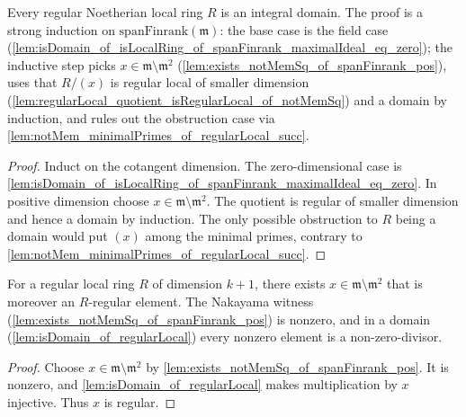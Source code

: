 \begin{lemma}\leanok
  \label{lem:isDomain_of_regularLocal}
  Every regular Noetherian local ring \(R\) is an integral domain. The proof is a strong
  induction on \(\text{spanFinrank}(\mathfrak m)\): the base case is the field case
  (\cref{lem:isDomain_of_isLocalRing_of_spanFinrank_maximalIdeal_eq_zero}); the inductive
  step picks \(x \in \mathfrak m \setminus \mathfrak m^2\)
  (\cref{lem:exists_notMemSq_of_spanFinrank_pos}), uses that \(R/(x)\) is regular local of
  smaller dimension (\cref{lem:regularLocal_quotient_isRegularLocal_of_notMemSq}) and a
  domain by induction, and rules out the obstruction case via
  \cref{lem:notMem_minimalPrimes_of_regularLocal_succ}.
\end{lemma}
\begin{proof}

\leanok
  Induct on the cotangent dimension. The zero-dimensional case is
  \cref{lem:isDomain_of_isLocalRing_of_spanFinrank_maximalIdeal_eq_zero}.
  In positive dimension choose \(x\in\mathfrak m\setminus\mathfrak m^2\).
  The quotient is regular of smaller dimension and hence a domain by
  induction. The only possible obstruction to \(R\) being a domain would
  put \((x)\) among the minimal primes, contrary to
  \cref{lem:notMem_minimalPrimes_of_regularLocal_succ}.
\end{proof}

\begin{lemma}\leanok
  \label{lem:exists_isSMulRegular_notMemSq_of_regularLocal_succ}
  For a regular local ring \(R\) of dimension \(k + 1\), there exists
  \(x \in \mathfrak m \setminus \mathfrak m^2\) that is moreover an \(R\)-regular element. The
  Nakayama witness (\cref{lem:exists_notMemSq_of_spanFinrank_pos}) is nonzero, and in a
  domain (\cref{lem:isDomain_of_regularLocal}) every nonzero element is a
  non-zero-divisor.
\end{lemma}
\begin{proof}

\leanok
  Choose \(x\in\mathfrak m\setminus\mathfrak m^2\) by
  \cref{lem:exists_notMemSq_of_spanFinrank_pos}. It is nonzero, and
  \cref{lem:isDomain_of_regularLocal} makes multiplication by \(x\)
  injective. Thus \(x\) is regular.
\end{proof}

